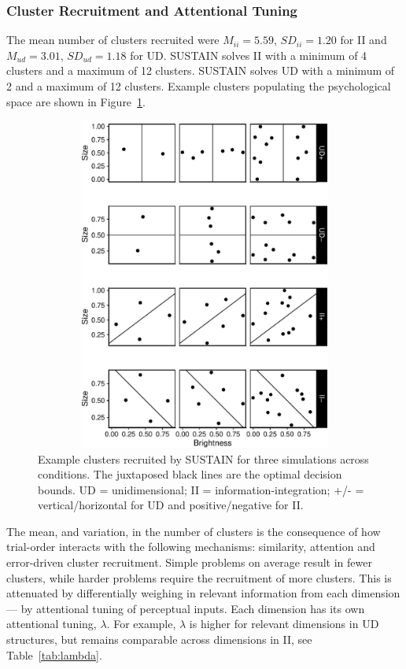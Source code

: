 \documentclass[10pt,letterpaper]{article}
\begin{document}
\subsubsection{Cluster Recruitment and Attentional Tuning}

The mean number of clusters recruited were $M_{ii} = 5.59$,
$SD_{ii} = 1.20$ for II and $M_{ud} = 3.01$,
$SD_{ud} = 1.18$ for UD. SUSTAIN solves II with a minimum of 4
clusters and a maximum of 12 clusters. SUSTAIN solves UD with a minimum
of 2 and a maximum of 12 clusters. Example clusters populating the
psychological space are shown in Figure~\ref{fig:clusters}.

\begin{figure}[h]
    \includegraphics[width=12cm,
  height=11cm,
  keepaspectratio]{pdf/clusters_old_bw.pdf}
    \caption{Example clusters recruited by SUSTAIN for three simulations
    across conditions. The juxtaposed black lines are
    the optimal decision bounds. UD = unidimensional; II = information-integration;
    +/- = vertical/horizontal for UD and positive/negative for II.}
\label{fig:clusters}
\end{figure}

The mean, and variation, in the number of clusters is the consequence of
how trial-order interacts with
the following mechanisms: similarity, attention and error-driven
cluster recruitment.
Simple problems on average result in fewer clusters, while harder
problems require the recruitment of more clusters.
This is attenuated by differentially weighing in relevant information
from each dimension --- by attentional tuning of perceptual inputs.
Each dimension has its own attentional tuning, $\lambda$. For example,
$\lambda$ is higher for relevant dimensions in UD structures, but
remains comparable across dimensions in II, see Table~\ref{tab:lambda}.
\end{document}
